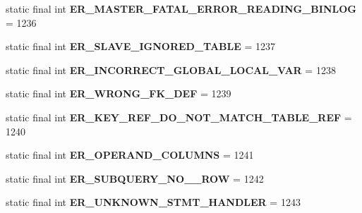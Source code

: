 \begin{DoxyCompactItemize}
static final int {\bfseries E\+R\+\_\+\+M\+A\+S\+T\+E\+R\+\_\+\+F\+A\+T\+A\+L\+\_\+\+E\+R\+R\+O\+R\+\_\+\+R\+E\+A\+D\+I\+N\+G\+\_\+\+B\+I\+N\+L\+OG} = 1236
\item 
\mbox{\label{classcom_1_1mysql_1_1jdbc_1_1_mysql_error_numbers_a143d85634e6f235c9b1f8dea4ff32c3e}} 
static final int {\bfseries E\+R\+\_\+\+S\+L\+A\+V\+E\+\_\+\+I\+G\+N\+O\+R\+E\+D\+\_\+\+T\+A\+B\+LE} = 1237
\item 
\mbox{\label{classcom_1_1mysql_1_1jdbc_1_1_mysql_error_numbers_a19b8ecafdbc8a931f8f06f4b78f46be2}} 
static final int {\bfseries E\+R\+\_\+\+I\+N\+C\+O\+R\+R\+E\+C\+T\+\_\+\+G\+L\+O\+B\+A\+L\+\_\+\+L\+O\+C\+A\+L\+\_\+\+V\+AR} = 1238
\item 
\mbox{\label{classcom_1_1mysql_1_1jdbc_1_1_mysql_error_numbers_a43ce9e7955b6d23d0e9124e1dd6b7b70}} 
static final int {\bfseries E\+R\+\_\+\+W\+R\+O\+N\+G\+\_\+\+F\+K\+\_\+\+D\+EF} = 1239
\item 
\mbox{\label{classcom_1_1mysql_1_1jdbc_1_1_mysql_error_numbers_a22a97193796efa82616e12646e9d942c}} 
static final int {\bfseries E\+R\+\_\+\+K\+E\+Y\+\_\+\+R\+E\+F\+\_\+\+D\+O\+\_\+\+N\+O\+T\+\_\+\+M\+A\+T\+C\+H\+\_\+\+T\+A\+B\+L\+E\+\_\+\+R\+EF} = 1240
\item 
\mbox{\label{classcom_1_1mysql_1_1jdbc_1_1_mysql_error_numbers_a7c15d66f96e2c1db8fe51ac68380402b}} 
static final int {\bfseries E\+R\+\_\+\+O\+P\+E\+R\+A\+N\+D\+\_\+\+C\+O\+L\+U\+M\+NS} = 1241
\item 
\mbox{\label{classcom_1_1mysql_1_1jdbc_1_1_mysql_error_numbers_aaa2046ef7075088e7db334ff24dc8ed7}} 
static final int {\bfseries E\+R\+\_\+\+S\+U\+B\+Q\+U\+E\+R\+Y\+\_\+\+N\+O\+\_\+\_\+\+R\+OW} = 1242
\item 
\mbox{\label{classcom_1_1mysql_1_1jdbc_1_1_mysql_error_numbers_a05df1e098beb7cd0e3a3a0f5c7b68d36}} 
static final int {\bfseries E\+R\+\_\+\+U\+N\+K\+N\+O\+W\+N\+\_\+\+S\+T\+M\+T\+\_\+\+H\+A\+N\+D\+L\+ER} = 1243

\end{DoxyCompactItemize}
